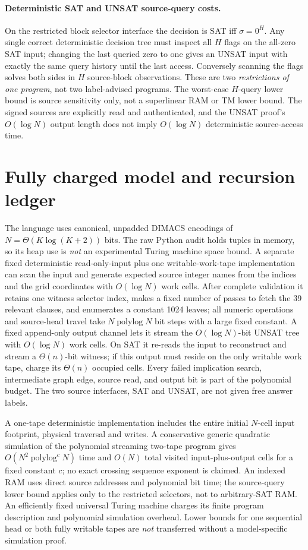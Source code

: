 \documentclass[11pt]{article}
\begin{document}
\paragraph{Deterministic SAT and UNSAT source-query costs.}
On the restricted block selector interface the decision is SAT iff $\sigma=0^H$. Any single correct deterministic decision tree must inspect all $H$ flags on the all-zero SAT input; changing the last queried zero to one gives an UNSAT input with exactly the same query history until the last access. Conversely scanning the flags solves both sides in $H$ source-block observations. These are two \emph{restrictions of one program}, not two label-advised programs. The worst-case $H$-query lower bound is source sensitivity only, not a superlinear RAM or TM lower bound. The signed sources are explicitly read and authenticated, and the UNSAT proof's $O(\log N)$ output length does not imply $O(\log N)$ deterministic source-access time.

\section{Fully charged model and recursion ledger}
The language uses canonical, unpadded DIMACS encodings of $N=\Theta(K\log(K+2))$ bits. The raw Python audit holds tuples in memory, so its heap use is \emph{not} an experimental Turing machine space bound. A separate fixed deterministic read-only-input plus one writable-work-tape implementation can scan the input and generate expected source integer names from the indices and the grid coordinates with $O(\log N)$ work cells. After complete validation it retains one witness selector index, makes a fixed number of passes to fetch the 39 relevant clauses, and enumerates a constant 1024 leaves; all numeric operations and source-head travel take $N\operatorname{polylog}N$ bit steps with a large fixed constant. A fixed append-only output channel lets it stream the $O(\log N)$-bit UNSAT tree with $O(\log N)$ work cells. On SAT it re-reads the input to reconstruct and stream a $\Theta(n)$-bit witness; if this output must reside on the only writable work tape, charge its $\Theta(n)$ occupied cells. Every failed implication search, intermediate graph edge, source read, and output bit is part of the polynomial budget. The two source interfaces, SAT and UNSAT, are not given free answer labels.

A one-tape deterministic implementation includes the entire initial $N$-cell input footprint, physical traversal and writes. A conservative generic quadratic simulation of the polynomial streaming two-tape program gives $O(N^2\operatorname{polylog}^cN)$ time and $O(N)$ total visited input-plus-output cells for a fixed constant $c$; no exact crossing sequence exponent is claimed. An indexed RAM uses direct source addresses and polynomial bit time; the source-query lower bound applies only to the restricted selectors, not to arbitrary-SAT RAM. An efficiently fixed universal Turing machine charges its finite program description and polynomial simulation overhead. Lower bounds for one sequential head or both fully writable tapes are \emph{not} transferred without a model-specific simulation proof.
\end{document}
